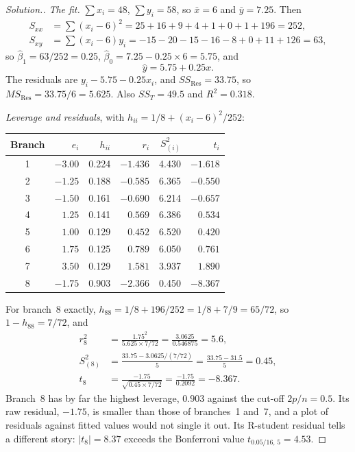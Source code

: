 \documentclass[11pt,a4paper]{article}
\numberwithin{equation}{section}
\theoremstyle{definition}
\newenvironment{solution}
  {\renewcommand{\qedsymbol}{}\begin{proof}[\textit{Solution}.]}
  {\end{proof}}
\begin{document}
\begin{solution}
\emph{The fit.} $\sum x_i = 48$, $\sum y_i = 58$, so $\bar x = 6$ and $\bar y = 7.25$. Then
\begin{align*}
S_{xx} &= \sum(x_i - 6)^2 = 25 + 16 + 9 + 4 + 1 + 0 + 1 + 196 = 252, \\
S_{xy} &= \sum(x_i - 6)y_i = -15 - 20 - 15 - 16 - 8 + 0 + 11 + 126 = 63,
\end{align*}
so $\hat\beta_1 = 63/252 = 0.25$, $\hat\beta_0 = 7.25 - 0.25 \times 6 = 5.75$, and
\[
\hat y = 5.75 + 0.25x .
\]
The residuals are $y_i - 5.75 - 0.25x_i$, and $SS_{\mathrm{Res}} = 33.75$, so
$MS_{\mathrm{Res}} = 33.75/6 = 5.625$. Also $SS_T = 49.5$ and $R^2 = 0.318$.

\emph{Leverage and residuals}, with $h_{ii} = 1/8 + (x_i - 6)^2/252$:
\begin{center}
\begin{tabular}{c|rrrrr}
Branch & $e_i$ & $h_{ii}$ & $r_i$ & $S^2_{(i)}$ & $t_i$ \\
\hline
1 & $-3.00$ & 0.224 & $-1.436$ & 4.430 & $-1.618$ \\
2 & $-1.25$ & 0.188 & $-0.585$ & 6.365 & $-0.550$ \\
3 & $-1.50$ & 0.161 & $-0.690$ & 6.214 & $-0.657$ \\
4 & $1.25$ & 0.141 & $0.569$ & 6.386 & $0.534$ \\
5 & $1.00$ & 0.129 & $0.452$ & 6.520 & $0.420$ \\
6 & $1.75$ & 0.125 & $0.789$ & 6.050 & $0.761$ \\
7 & $3.50$ & 0.129 & $1.581$ & 3.937 & $1.890$ \\
8 & $-1.75$ & 0.903 & $-2.366$ & 0.450 & $-8.367$ \\
\end{tabular}
\end{center}
For branch~8 exactly, $h_{88} = 1/8 + 196/252 = 1/8 + 7/9 = 65/72$, so $1 - h_{88} = 7/72$, and
\begin{align*}
r_8^2 &= \frac{1.75^2}{5.625 \times 7/72} = \frac{3.0625}{0.546875} = 5.6, \\
S^2_{(8)} &= \frac{33.75 - 3.0625/(7/72)}{5} = \frac{33.75 - 31.5}{5} = 0.45, \\
t_8 &= \frac{-1.75}{\sqrt{0.45 \times 7/72}} = \frac{-1.75}{0.2092} = -8.367 .
\end{align*}
Branch~8 has by far the highest leverage, $0.903$ against the cut-off $2p/n = 0.5$. Its raw
residual, $-1.75$, is smaller than those of branches~1 and~7, and a plot of residuals against
fitted values would not single it out. Its R-student residual tells a different story:
$|t_8| = 8.37$ exceeds the Bonferroni value $t_{0.05/16,\,5} = 4.53$.


\end{solution}
\end{document}
